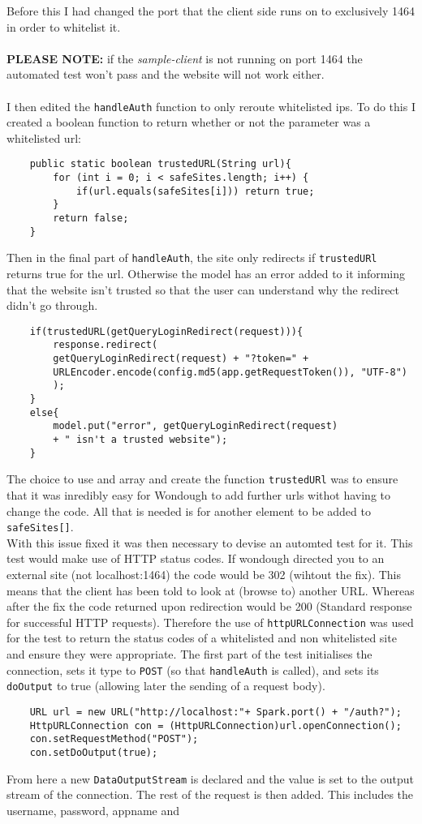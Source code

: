 Before this I had changed the port that the client side runs on to exclusively 1464 in order to whitelist it.\\ \\
\textbf{PLEASE NOTE:} if the \textit{sample-client} is not running on port 1464 the automated test won't pass and the website will not work either.\\ \\
I then edited the \verb|handleAuth| function to only reroute whitelisted ips. To do this I created a boolean function to return whether or not the parameter was a whitelisted url:
\begin{verbatim}
    public static boolean trustedURL(String url){
        for (int i = 0; i < safeSites.length; i++) {
            if(url.equals(safeSites[i])) return true;
        }
        return false;
    }
\end{verbatim}
Then in the final part of \verb|handleAuth|, the site only redirects if \verb|trustedURl| returns true for the url. Otherwise the model has an error added to it informing that the
website isn't trusted so that the user can understand why the redirect didn't go through.
\begin{verbatim}
    if(trustedURL(getQueryLoginRedirect(request))){
        response.redirect(
        getQueryLoginRedirect(request) + "?token=" +
        URLEncoder.encode(config.md5(app.getRequestToken()), "UTF-8")
        );
    }
    else{
        model.put("error", getQueryLoginRedirect(request)
        + " isn't a trusted website");
    }
\end{verbatim}
The choice to use and array and create the function \verb|trustedURl| was to ensure that it was inredibly easy for Wondough to add further urls withot having to change the code. All
that is needed is for another element to be added to \verb|safeSites[]|.\\
With this issue fixed it was then necessary to devise an automted test for it. This test would make use of HTTP status codes. If wondough directed you to an external site (not localhost:1464)
the code would be 302 (wihtout the fix). This means that the client has been told to look at (browse to) another URL. Whereas after the fix the code returned upon redirection would
be 200 (Standard response for successful HTTP requests)\cite{http}. Therefore the use of \verb|httpURLConnection| was used for the test to return the status codes of a whitelisted and
non whitelisted site and ensure they were appropriate. The first part of the test initialises the connection, sets it type to \verb|POST| (so that \verb|handleAuth| is called), and sets its \verb|doOutput| to true (allowing later the sending of a request body).
\begin{verbatim}
    URL url = new URL("http://localhost:"+ Spark.port() + "/auth?");
    HttpURLConnection con = (HttpURLConnection)url.openConnection();
    con.setRequestMethod("POST");
    con.setDoOutput(true);
\end{verbatim}
From here a new \verb|DataOutputStream| is declared and the value is set to the output stream of the connection. The rest of the request is then added. This includes the username, password,
appname and 


